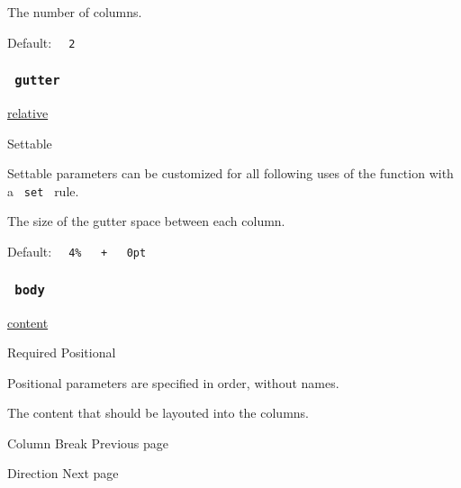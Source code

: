 The number of columns.

Default: \texttt{\ }{\texttt{\ 2\ }}\texttt{\ }

\subsubsection{\texorpdfstring{\texttt{\ gutter\ }}{ gutter }}\label{parameters-gutter}

\href{/docs/reference/layout/relative/}{relative}

{{ Settable }}

\label{parameters-gutter-settable-tooltip}
Settable parameters can be customized for all following uses of the
function with a \texttt{\ set\ } rule.

The size of the gutter space between each column.

Default:
\texttt{\ }{\texttt{\ 4\%\ }}\texttt{\ }{\texttt{\ +\ }}\texttt{\ }{\texttt{\ 0pt\ }}\texttt{\ }

\subsubsection{\texorpdfstring{\texttt{\ body\ }}{ body }}\label{parameters-body}

\href{/docs/reference/foundations/content/}{content}

{Required} {{ Positional }}

\label{parameters-body-positional-tooltip}
Positional parameters are specified in order, without names.

The content that should be layouted into the columns.

\href{/docs/reference/layout/colbreak/}{\pandocbounded{}}

{ Column Break } { Previous page }

\href{/docs/reference/layout/direction/}{\pandocbounded{}}

{ Direction } { Next page }
